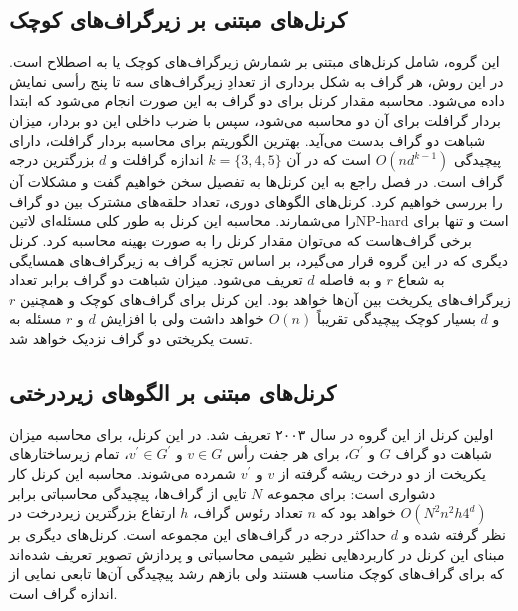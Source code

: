 \subsection{کرنل‌های مبتنی بر زیرگراف‌های کوچک}
این گروه، شامل کرنل‌های مبتنی بر شمارش زیرگراف‌های کوچک یا به اصطلاح  است. در این روش، هر گراف به شکل برداری از تعدادِ زیرگراف‌های سه تا پنج رأسی نمایش داده می‌شود. محاسبه مقدار کرنل برای دو گراف به این صورت انجام می‌شود که ابتدا بردار گرافلت برای آن دو محاسبه می‌شود، سپس با ضرب داخلی این دو بردار، میزان شباهت دو گراف بدست می‌آید. بهترین الگوریتم برای محاسبه بردار گرافلت، دارای پیچیدگی $O(nd^{k-1})$ است که در آن $k = \lbrace{3,4,5}\rbrace$ اندازه گرافلت و $d$ بزرگترین درجه گراف است. در فصل  راجع به این کرنل‌ها به تفصیل سخن خواهیم گفت و مشکلات آن‌ را بررسی خواهیم کرد.
کرنل‌های الگوهای دوری، تعداد حلقه‌های مشترک بین دو گراف را می‌شمارند. محاسبه این کرنل به طور کلی مسئله‌ای ‌لاتین{NP-hard} است و تنها برای برخی گراف‌هاست که می‌توان مقدار کرنل را به صورت بهینه محاسبه کرد. کرنل دیگری که در این گروه قرار می‌گیرد، بر اساس تجزیه گراف به زیرگراف‌های همسایگی به شعاع $r$ و به فاصله $d$ تعریف می‌شود. میزان شباهت دو گراف برابر تعداد زیرگراف‌های یکریخت بین آن‌ها خواهد بود. این کرنل برای گراف‌های کوچک و همچنین $r$ و $d$ بسیار کوچک پیچیدگی تقریباً $O(n)$ خواهد داشت ولی با افزایش $d$ و $r$ مسئله به تست یکریختی دو گراف نزدیک خواهد شد.

\subsection{کرنل‌های مبتنی بر الگوهای زیردرختی}
اولین کرنل از این گروه در سال ۲۰۰۳ تعریف شد. در این کرنل، برای محاسبه میزان شباهت دو گراف $G$ و $G^\prime$، برای هر جفت رأس $v \in G$ و $v^\prime \in G^\prime$، تمام زیرساختارهای یکریخت از دو درخت ریشه گرفته از $v$ و $v^\prime$ شمرده می‌شوند. محاسبه این کرنل کار دشواری است: برای مجموعه $N$ تایی از گراف‌ها، پیچیدگی محاسباتی برابر $O(N^2n^2h4^d)$ خواهد بود که $n$ تعداد رئوس گراف، $h$ ارتفاع بزرگترین زیردرخت در نظر گرفته شده و $d$ حداکثر درجه در گراف‌های این مجموعه است. کرنل‌های دیگری بر مبنای این کرنل در کاربردهایی نظیر شیمی محاسباتی و پردازش تصویر تعریف شده‌اند که برای گراف‌های کوچک مناسب هستند ولی بازهم رشد پیچیدگی آن‌ها تابعی نمایی از اندازه گراف است.

